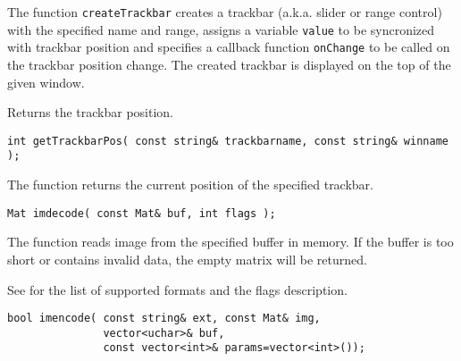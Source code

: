 The function \texttt{createTrackbar} creates a trackbar (a.k.a. slider or range control) with the specified name and range, assigns a variable \texttt{value} to be syncronized with trackbar position and specifies a callback function \texttt{onChange} to be called on the trackbar position change. The created trackbar is displayed on the top of the given window.


\label{getTrackbarPos}
Returns the trackbar position.

\begin{lstlisting}
int getTrackbarPos( const string& trackbarname, const string& winname );
\end{lstlisting}
\begin{description}
\end{description}

The function returns the current position of the specified trackbar.

\label{imdecode}

\begin{lstlisting}
Mat imdecode( const Mat& buf, int flags );
\end{lstlisting}
\begin{description}
\end{description}

The function reads image from the specified buffer in memory.
If the buffer is too short or contains invalid data, the empty matrix will be returned.

See  for the list of supported formats and the flags description. 

\label{imencode}

\begin{lstlisting}
bool imencode( const string& ext, const Mat& img,
               vector<uchar>& buf,
               const vector<int>& params=vector<int>());
\end{lstlisting}
\begin{description}
\end{description}

